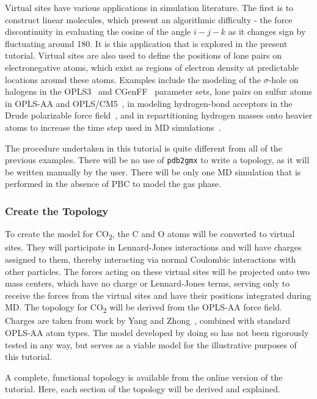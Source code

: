 \documentclass[9pt,tutorial,pubversion]{livecoms}
\begin{document}
Virtual sites have various applications in simulation literature. The first is to construct linear molecules, which present an algorithmic difficulty - the force discontinuity in evaluating the cosine of the angle $i-j-k$ as it changes sign by fluctuating around 180\textdegree. It is this application that is explored in the present tutorial. Virtual sites are also used to define the positions of lone pairs on electronegative atoms, which exist as regions of electron density at predictable locations around these atoms. Examples include the modeling of the $\sigma$-hole on halogens in the OPLS3~\cite{Harder2016} and CGenFF~\cite{Gutierrez2016} parameter sets, lone pairs on sulfur atoms in OPLS-AA and OPLS/CM5~\cite{Yan2017}, in modeling hydrogen-bond acceptors in the Drude polarizable force field~\cite{Harder2006,Lemkul2016}, and in repartitioning hydrogen masses onto heavier atoms to increase the time step used in MD simulations~\cite{Feenstra1999,Bjelkmar2010}.

The procedure undertaken in this tutorial is quite different from all of the previous examples. There will be no use of \texttt{pdb2gmx} to write a topology, as it will be written manually by the user. There will be only one MD simulation that is performed in the absence of PBC to model the gas phase.

\subsubsection{Create the Topology} \label{vsite_top}

To create the model for CO\textsubscript{2}, the C and O atoms will be converted to virtual sites. They will participate in Lennard-Jones interactions and will have charges assigned to them, thereby interacting via normal Coulombic interactions with other particles. The forces acting on these virtual sites will be projected onto two mass centers, which have no charge or Lennard-Jones terms, serving only to receive the forces from the virtual sites and have their positions integrated during MD. The topology for CO\textsubscript{2} will be derived from the OPLS-AA force field. Charges are taken from work by Yang and Zhong~\cite{Yang2006}, combined with standard OPLS-AA atom types. The model developed by doing so has not been rigorously tested in any way, but serves as a viable model for the illustrative purposes of this tutorial.

A complete, functional topology is available from the online version of the tutorial. Here, each section of the topology will be derived and explained.
\end{document}
